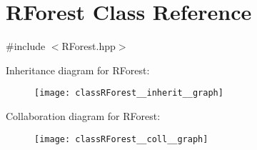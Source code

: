 \hypertarget{classRForest}{}\section{R\+Forest Class Reference}
\label{classRForest}


{\ttfamily \#include $<$R\+Forest.\+hpp$>$}



Inheritance diagram for R\+Forest\+:\nopagebreak
\begin{figure}[H]
\begin{center}
\leavevmode
\texttt{[image: classRForest\_\_inherit\_\_graph]}
\end{center}
\end{figure}


Collaboration diagram for R\+Forest\+:\nopagebreak
\begin{figure}[H]
\begin{center}
\leavevmode
\texttt{[image: classRForest\_\_coll\_\_graph]}
\end{center}
\end{figure}
